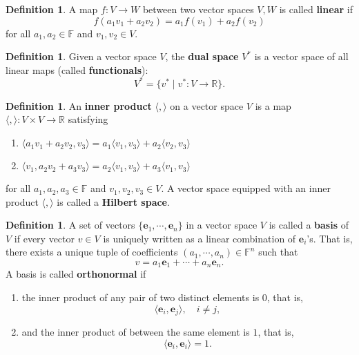 \documentclass{beamer}
\theoremstyle{plain}
\theoremstyle{definition}
\newtheorem{defn}[thm]{Definition}
\begin{document}
\begin{frame}
\begin{defn}
A map $f:V\to W$ between two vector spaces $V, W$ is called \textbf{linear} if 
	$$f(a_1v_1+a_2v_2) = a_1f(v_1)+a_2f(v_2)$$
for all $a_1,a_2\in \mathbb F$ and $v_1,v_2\in V$.
\end{defn}
\begin{defn}
Given a vector space $V$, the \textbf{dual space} $V^*$ is a vector space 
of all linear maps (called \textbf{functionals}):
	$$V^*=\{v^*\mid v^*:V\to \mathbb R\}.$$
\end{defn}
\end{frame}

\begin{frame}
\begin{defn}
An \textbf{inner product} $\langle,\rangle$ on a vector space $V$ 
is a map $\langle,\rangle:V\times V\to\mathbb R$ satisfying
\begin{enumerate}
	\item $\langle a_1v_1+a_2v_2,v_3\rangle = a_1\langle v_1,v_3\rangle + a_2\langle v_2,v_3\rangle$
	\item $\langle v_1,a_2v_2+a_3v_3\rangle = a_2\langle v_1,v_3\rangle + a_3\langle v_1,v_3\rangle$
\end{enumerate}
for all $a_1,a_2,a_3\in\mathbb F$ and $v_1,v_2,v_3\in V$.
A vector space equipped with an inner product $\langle,\rangle$ 
is called a \textbf{Hilbert space}.
\end{defn}
\end{frame}

\begin{frame}
\begin{defn}
A set of vectors $\{\mathbf e_1,\cdots, \mathbf e_n\}$ in a vector space $V$ 
is called a \textbf{basis} of $V$ if every vector $v\in V$ 
is uniquely written as a linear combination of $\mathbf e_i$'s.
That is, there exists a unique tuple of coefficients $(a_1,\cdots,a_n)\in\mathbb F^n$ such that
	$$v = a_1\mathbf e_1+\cdots+a_n\mathbf e_n.$$
A basis is called \textbf{orthonormal} if 
\begin{enumerate}
	\item the inner product of any pair of 
	two distinct elements is $0$, that is,
		$$\langle \mathbf e_i,\mathbf e_j\rangle,\quad i\neq j,$$
	\item and the inner product of between the same element is $1$, that is,
		$$\langle \mathbf e_i,\mathbf e_i\rangle = 1.$$
\end{enumerate}
\end{defn}
\end{frame}
\end{document}
